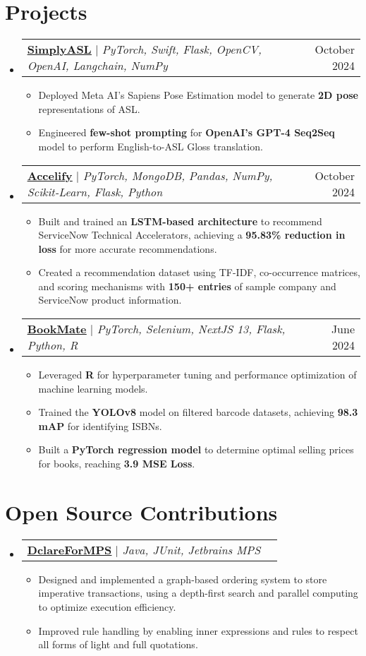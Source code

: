 \documentclass[letterpaper,11pt]{article}
\makeatletter
\newcommand{\resumeItem}[1]{
  \item\small{
    {#1 \vspace{-2pt}}
  }
}
\newcommand{\resumeProjectHeading}[2]{
    \item
    \begin{tabular*}{0.97\textwidth}{l@{\extracolsep{\fill}}r}
      \small#1 & #2 \\
    \end{tabular*}\vspace{-7pt}
}
\newcommand{\resumeSubHeadingListStart}{\begin{itemize}[leftmargin=0.15in, label={}]}
\newcommand{\resumeSubHeadingListEnd}{\end{itemize}}
\newcommand{\resumeItemListStart}{\begin{itemize}}
\newcommand{\resumeItemListEnd}{\end{itemize}\vspace{-5pt}}
\makeatother
\begin{document}
\section{Projects}
  \resumeSubHeadingListStart
    \resumeProjectHeading
      {\faGithub\hspace{0.25pt} \href{https://github.com/DRobinson4105/Simply-ASL}{\textbf{\uline{SimplyASL}}} $|$ \emph{PyTorch, Swift, Flask, OpenCV, OpenAI, Langchain, NumPy}}{October 2024}
      \resumeItemListStart
        \resumeItem{Deployed Meta AI’s Sapiens Pose Estimation model to generate \textbf{2D pose} representations of ASL.}
        \resumeItem{Engineered \textbf{few-shot prompting} for \textbf{OpenAI's GPT-4 Seq2Seq} model to perform English-to-ASL Gloss translation.}
      \resumeItemListEnd
    \resumeProjectHeading
      {\faGithub\hspace{0.25pt} \href{https://github.com/DRobinson4105/accelify}{\textbf{\uline{Accelify}}} $|$ \emph{PyTorch, MongoDB, Pandas, NumPy, Scikit-Learn, Flask, Python}}{October 2024}
      \resumeItemListStart
        \resumeItem{Built and trained an \textbf{LSTM-based architecture} to recommend ServiceNow Technical Accelerators, achieving a \textbf{95.83\% reduction in loss} for more accurate recommendations.}
        \resumeItem{Created a recommendation dataset using TF-IDF, co-occurrence matrices, and scoring mechanisms with \textbf{150+ entries} of sample company and ServiceNow product information.}
      \resumeItemListEnd
    \resumeProjectHeading
      {\faGithub\hspace{0.25pt} \href{https://github.com/DRobinson4105/bookmate}{\textbf{\uline{BookMate}}} $|$ \emph{PyTorch, Selenium, NextJS 13, Flask, Python, R}}{June 2024}
      \resumeItemListStart
        \resumeItem{Leveraged \textbf{R} for hyperparameter tuning and performance optimization of machine learning models.}
        \resumeItem{Trained the \textbf{YOLOv8} model on filtered barcode datasets, achieving \textbf{98.3 mAP} for identifying ISBNs.}
        \resumeItem{Built a \textbf{PyTorch regression model} to determine optimal selling prices for books, reaching \textbf{3.9 MSE Loss}.}
      \resumeItemListEnd
  \resumeSubHeadingListEnd

\section{Open Source Contributions}
  \resumeSubHeadingListStart
    \resumeProjectHeading
      {\faGithub\hspace{0.25pt} \href{https://github.com/ModelingValueGroup/dclareForMPS}{\textbf{\uline{DclareForMPS}}} $|$ \emph{Java, JUnit, Jetbrains MPS}}{}
      \resumeItemListStart
        \resumeItem{Designed and implemented a graph-based ordering system to store imperative transactions, using a depth-first search and parallel computing to optimize execution efficiency.}
        \resumeItem{Improved rule handling by enabling inner expressions and rules to respect all forms of light and full quotations.}
      \resumeItemListEnd
  \resumeSubHeadingListEnd
\end{document}
